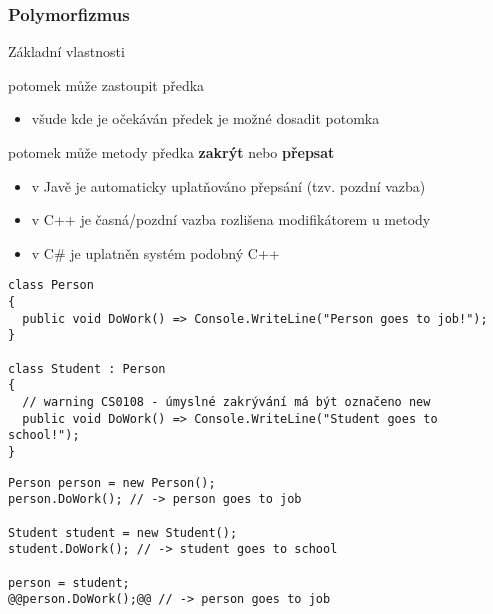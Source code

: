 \begin{frame}[fragile]
\frametitle{Polymorfizmus}

\begin{bitemize}{Základní vlastnosti}
\item potomek může zastoupit předka
\begin{itemize}
\item všude kde je očekáván předek je možné dosadit potomka
\end{itemize}

\item potomek může metody předka \textbf{zakrýt} nebo \textbf{přepsat}
\begin{itemize}
\item v Javě je automaticky uplatňováno přepsání (tzv. pozdní vazba)
\item v C++ je časná/pozdní vazba rozlišena modifikátorem u metody
\item v C\# je uplatněn systém podobný C++
\end{itemize}

\end{bitemize}
\end{frame}



\begin{frame}[fragile]
\begin{noblock}
\begin{lstlisting}[basicstyle=\small]
class Person
{
  public void DoWork() => Console.WriteLine("Person goes to job!");
}

class Student : Person
{
  // warning CS0108 - úmyslné zakrývání má být označeno new
  public void DoWork() => Console.WriteLine("Student goes to school!");
}
\end{lstlisting}
\end{noblock}
\vfill
\begin{yesblock}
\begin{lstlisting}[basicstyle=\small]
Person person = new Person();
person.DoWork(); // -> person goes to job

Student student = new Student();
student.DoWork(); // -> student goes to school

person = student;
@@person.DoWork();@@ // -> person goes to job 
\end{lstlisting}
\end{yesblock}
\end{frame}



